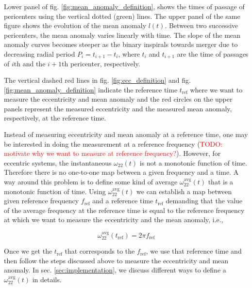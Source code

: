 \documentclass[aps,prd,amsmath,floats,floatfix, twocolumn,
superscriptaddress,nofootinbib,showpacs]{revtex4-1}
\newcommand{\red}{\textcolor{red}}
\newcommand{\TODO}[1]{\red{TODO: #1}}
\begin{document}
Lower panel of fig. \ref{fig:mean_anomaly_definition}, shows the times
of passage of pericenters using the vertical dotted (green)
lines. The upper panel of the same figure shows the evolution of the
mean anomaly $l(t)$. Between two successive pericenters, the mean
anomaly varies linearly with time. The slope of the mean anomaly
curves becomes steeper as the binary inspirals towards merger due to
decreasing radial period $P_{i} = t_{i+1} - t_i$, where $t_{i}$ and
$t_{i+1}$ are the time of passages of $i$th and the $i+1$th
pericenter, respectively.

The vertical dashed red lines in fig. \ref{fig:ecc_definition} and
fig. \ref{fig:mean_anomaly_definition} indicate the reference time
$t_{\text{ref}}$ where we want to measure the eccentricity and mean
anomaly and the red circles on the upper panels represent the measured
eccentricity and the measured mean anomaly, respectively, at the
reference time.

Instead of measuring eccentricity and mean anomaly at a reference
time, one may be interested in doing the measurement at a reference
frequency (\TODO{motivate why we want to measure at reference
frequency?}). However, for eccentric systems, the instantaneous
$\omega_{22}(t)$ is not a monotonic function of time. Therefore there
is no one-to-one map between a given frequency and a time. A way
around this problem is to define some kind of average
$\omega^{\text{avg}}_{22}(t)$ that is a monotonic function of
time. Using $\omega^{\text{avg}}_{22}(t)$ we can establish a map
between given reference frequency $f_{\text{ref}}$ and a reference
time $t_{\text{ref}}$ demanding that the value of the average
frequency at the reference time is equal to the reference frequency at
which we want to measure the eccentricity and the mean anomaly, i.e.,

\begin{equation}
  \label{eq:map-between-ref-freq-and-ref-time}
  \omega^{\text{avg}}_{22}(t_{\text{ref}}) = 2 \pi f_{\text{ref}}
\end{equation}

Once we get the $t_{\text{ref}}$ that corresponds to the
$f_{\text{ref}}$, we use that reference time and then follow the steps
discussed above to measure the eccentricity and mean anomaly. In
sec. \ref{sec:implementation}, we discuss different ways to define a
$\omega^{\text{avg}}_{22}(t)$ in details.
\end{document}
